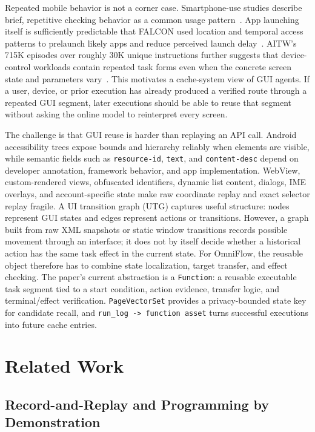 \documentclass[sigplan,10pt]{acmart}
\newcommand{\sysname}{OmniFlow\xspace}
\begin{document}
Repeated mobile behavior is not a corner case. Smartphone-use studies describe
brief, repetitive checking behavior as a common usage
pattern~\cite{oulasvirta2012habits}. App launching itself is sufficiently
predictable that FALCON used location and temporal access patterns to prelaunch
likely apps and reduce perceived launch delay~\cite{yan2012fast}. AITW's 715K
episodes over roughly 30K unique instructions further suggests that
device-control workloads contain repeated task forms even when the concrete
screen state and parameters vary~\cite{rawles2023android}. This motivates a
cache-system view of GUI agents. If a user, device, or prior execution has
already produced a verified route through a repeated GUI segment, later
executions should be able to reuse that segment without asking the online model
to reinterpret every screen.

The challenge is that GUI reuse is harder than replaying an API call. Android
accessibility trees expose bounds and hierarchy reliably when elements are
visible, while semantic fields such as \texttt{resource-id}, \texttt{text}, and
\texttt{content-desc} depend on developer annotation, framework behavior, and
app implementation. WebView, custom-rendered views, obfuscated identifiers,
dynamic list content, dialogs, IME overlays, and account-specific state make raw
coordinate replay and exact selector replay fragile. A UI transition graph
(UTG) captures useful structure: nodes represent GUI states and edges represent
actions or transitions. However, a graph built from raw XML snapshots or static
window transitions records possible movement through an interface; it does not
by itself decide whether a historical action has the same task effect in the
current state. For \sysname, the reusable object therefore has to combine state
localization, target transfer, and effect checking. The paper's current
abstraction is a \texttt{Function}: a reusable executable task segment tied to a
start condition, action evidence, transfer logic, and terminal/effect
verification. \texttt{PageVectorSet} provides a privacy-bounded state key for
candidate recall, and \texttt{run\_log -> function asset} turns successful
executions into future cache entries.

\section{Related Work}

\subsection{Record-and-Replay and Programming by Demonstration}
\end{document}

